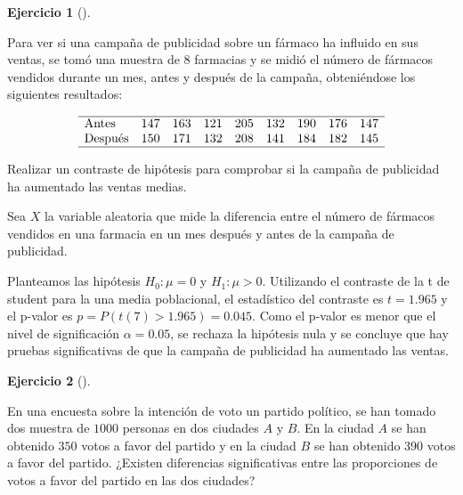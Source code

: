 \documentclass[
  spanish,
  a4paper,
]{scrreport}
\theoremstyle{definition}
\newtheorem{exercise}{Ejercicio}[chapter]
\theoremstyle{remark}
\begin{document}
\begin{exercise}[]\protect\hypertarget{exr-contraste-medias-ventas}{}\label{exr-contraste-medias-ventas}

Para ver si una campaña de publicidad sobre un fármaco ha influido en
sus ventas, se tomó una muestra de \(8\) farmacias y se midió el número
de fármacos vendidos durante un mes, antes y después de la campaña,
obteniéndose los siguientes resultados:

\[
\begin{array}{lcccccccc}
\hline
\mbox{Antes} & 147 & 163 & 121 & 205 & 132 & 190 & 176 & 147  \\
\mbox{Después} & 150 & 171 & 132 & 208 & 141 & 184 & 182 & 145  \\
\hline
\end{array}
\]

Realizar un contraste de hipótesis para comprobar si la campaña de
publicidad ha aumentado las ventas medias.

\end{exercise}

\begin{tcolorbox}[enhanced jigsaw, arc=.35mm, bottomrule=.15mm, bottomtitle=1mm, breakable, colback=white, colbacktitle=quarto-callout-tip-color!10!white, colframe=quarto-callout-tip-color-frame, coltitle=black, left=2mm, leftrule=.75mm, opacityback=0, opacitybacktitle=0.6, rightrule=.15mm, title=\textcolor{quarto-callout-tip-color}{\faLightbulb}\hspace{0.5em}{Solución}, titlerule=0mm, toprule=.15mm, toptitle=1mm]

Sea \(X\) la variable aleatoria que mide la diferencia entre el número
de fármacos vendidos en una farmacia en un mes después y antes de la
campaña de publicidad.

Planteamos las hipótesis \(H_0: \mu = 0\) y \(H_1: \mu>0\). Utilizando
el contraste de la t de student para la una media poblacional, el
estadístico del contraste es \(t=1.965\) y el p-valor es
\(p = P(t(7)>1.965) = 0.045\). Como el p-valor es menor que el nivel de
significación \(\alpha = 0.05\), se rechaza la hipótesis nula y se
concluye que hay pruebas significativas de que la campaña de publicidad
ha aumentado las ventas.

\end{tcolorbox}

\begin{exercise}[]\protect\hypertarget{exr-contraste-proporciones-voto}{}\label{exr-contraste-proporciones-voto}

En una encuesta sobre la intención de voto un partido político, se han
tomado dos muestra de \(1000\) personas en dos ciudades \(A\) y \(B\).
En la ciudad \(A\) se han obtenido \(350\) votos a favor del partido y
en la ciudad \(B\) se han obtenido \(390\) votos a favor del partido.
¿Existen diferencias significativas entre las proporciones de votos a
favor del partido en las dos ciudades?

\end{exercise}
\end{document}
